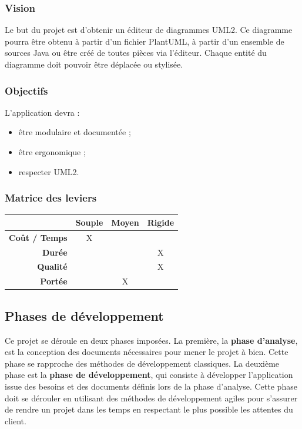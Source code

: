 \documentclass[hidelinks, 10pt,a4paper]{article}
\begin{document}
\subsubsection*{Vision}
Le but du projet est d'obtenir un éditeur de diagrammes UML2. Ce diagramme pourra
être obtenu à partir d'un fichier PlantUML, à partir d'un ensemble de sources Java
ou être créé de toutes pièces via l'éditeur. Chaque entité du diagramme doit pouvoir
être déplacée ou stylisée.

\subsubsection*{Objectifs}
L'application devra :
\begin{itemize}
\item être modulaire et documentée ;
\item être ergonomique ;
\item respecter UML2.
\end{itemize}

\subsubsection{Matrice des leviers}

\begin{center}
\begin{tabular}{|r|c|c|c|}
   \hline{} & {\textbf{Souple}} & {\textbf{Moyen}} & {\textbf{Rigide}} \\\hline
   {\textbf{Coût / Temps}} & {X} & {} & {} \\\hline
   {\textbf{Durée}} & {} & {} & {X} \\\hline
   {\textbf{Qualité}} & {} & {} & {X} \\\hline
   {\textbf{Portée}} & {} & {X} & {} \\\hline
\end{tabular}
\end{center}

\subsection{Phases de développement}
Ce projet se déroule en deux phases imposées. La première,
la \textbf{phase d'analyse}, est la conception des documents nécessaires pour
mener le projet à bien. Cette phase se rapproche des méthodes de développement
classiques. La deuxième phase est la \textbf{phase de développement}, qui consiste
à développer l'application issue des besoins et des documents définis lors de la
phase d'analyse. Cette phase doit se dérouler en utilisant des méthodes de développement
agiles pour s'assurer de rendre un projet dans les temps en respectant le plus possible 
les attentes du client.
\end{document}
